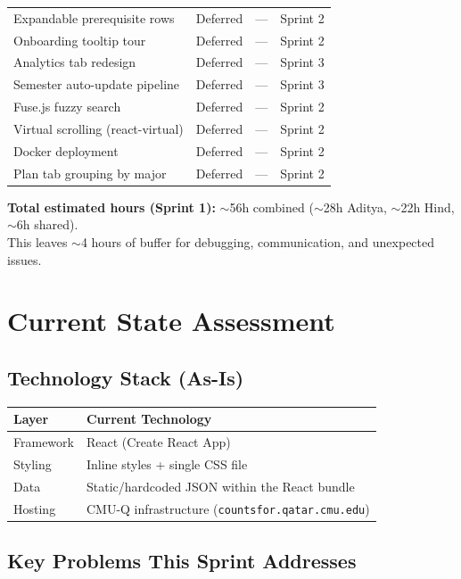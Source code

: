\documentclass[11pt]{article}
\begin{document}
\begin{longtable}{p{} p{} p{} p{}}
\rowcolor{deferGray}
Expandable prerequisite rows & Deferred & --- & Sprint 2 \\
\rowcolor{deferGray}
Onboarding tooltip tour & Deferred & --- & Sprint 2 \\
\rowcolor{deferGray}
Analytics tab redesign & Deferred & --- & Sprint 3 \\
\rowcolor{deferGray}
Semester auto-update pipeline & Deferred & --- & Sprint 3 \\
\rowcolor{deferGray}
Fuse.js fuzzy search & Deferred & --- & Sprint 2 \\
\rowcolor{deferGray}
Virtual scrolling (react-virtual) & Deferred & --- & Sprint 2 \\
\rowcolor{deferGray}
Docker deployment & Deferred & --- & Sprint 2 \\
\rowcolor{deferGray}
Plan tab grouping by major & Deferred & --- & Sprint 2 \\
\bottomrule
\end{longtable}

\textbf{Total estimated hours (Sprint 1):} $\sim$56h combined ($\sim$28h Aditya, $\sim$22h Hind, $\sim$6h shared).\\
This leaves $\sim$4 hours of buffer for debugging, communication, and unexpected issues.

\section{Current State Assessment}

\subsection{Technology Stack (As-Is)}

\begin{tabular}{p{} p{}}
\toprule
\textbf{Layer} & \textbf{Current Technology} \\
\midrule
Framework & React (Create React App) \\
Styling & Inline styles + single CSS file \\
Data & Static/hardcoded JSON within the React bundle \\
Hosting & CMU-Q infrastructure (\texttt{countsfor.qatar.cmu.edu}) \\
\bottomrule
\end{tabular}

\subsection{Key Problems This Sprint Addresses}
\end{document}
